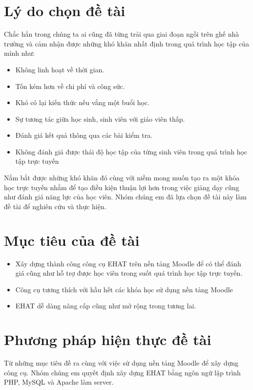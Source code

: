 \section{Lý do chọn đề tài}
Chắc hẳn trong chúng ta ai cũng đã từng trải qua giai đoạn ngồi trên ghế nhà trường và cảm nhận được những khó khăn nhất định trong quá trình học tập của mình như:
\begin{itemize}
	\item Không linh hoạt về thời gian.
	\item Tốn kém hơn về chi phí và công sức.
	\item Khó có lại kiến thức nếu vắng một buổi học.
	\item Sự tương tác giữa học sinh, sinh viên với giáo viên thấp.
	\item Đánh giá kết quả thông qua các bài kiểm tra.
	\item Không đánh giá được thái độ học tập của từng sinh viên trong quá trình học tập trực tuyến
\end{itemize}
Nắm bắt được những khó khăn đó cùng với niềm mong muốn tạo ra một khóa học trực tuyến nhằm để tạo điều kiện thuận lợi hơn trong việc giảng dạy cũng như đánh giá năng lực của học viên. Nhóm chúng em đã lựa chọn đề tài này làm đề tài để nghiên cứu và thực hiện.

\section{Mục tiêu của đề tài}
\begin{itemize}
	\item Xây dựng thành công công cụ EHAT trên nền tảng Moodle để có thể đánh giá cũng như hỗ trợ được học viên trong suốt quá trình học tập trực tuyến.
	\item Công cụ tương thích với hầu hết các khóa học sử dụng nền tảng Moodle
	\item EHAT dễ dàng nâng cấp cũng như mở rộng trong tương lai.
\end{itemize}

\section{Phương pháp hiện thực đề tài}
Từ những mục tiêu đề ra cùng với việc sử dụng nền tảng Moodle để xây dựng công cụ. Nhóm chúng em quyết định xây dựng EHAT bằng ngôn ngữ lập trình PHP, MySQL và Apache làm server.

